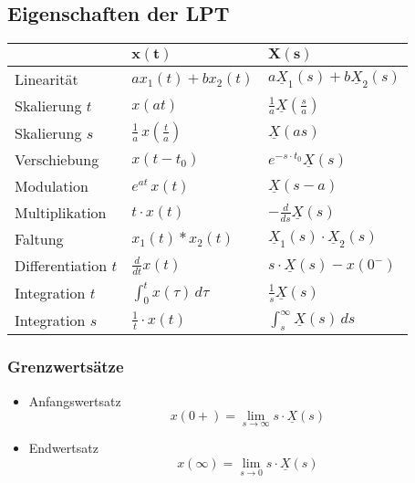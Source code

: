 \subsection{Eigenschaften der LPT}
\renewcommand{\arraystretch}{1.7}
\begin{tabularx}{\columnwidth}{|X|X|X|}
	\hline
	& $\mathbf{x(t)}$ & \underline{$\mathbf{X}$}$\mathbf{(s)}$\\
	\hline Linearität & $a x_{1}(t)+b x_{2}(t)$ & $a \underline{X}_{1}(s)+b\underline{X}_{2}(s)$ \\
	\hline Skalierung $t$ & $x(at)$ & $\frac{1}{a} \underline{X}(\frac{s}{a})$ \\
	\hline Skalierung $s$ & $\frac{1}{a} \, x(\frac{t}{a})$ & $\underline{X}(as)$ \\
	\hline Verschiebung	& $x(t-t_0)$ & $e^{-s \cdot t_0} \underline{X}(s)$ \\
	\hline Modulation & $e^{at} \, x(t)$ & $\underline{X} (s-a)$ \\
	\hline Multiplikation & $t \cdot x(t) $ & $-\frac{d}{d s} \underline{X}(s)$ \\
	\hline Faltung & $x_{1}(t) * x_{2}(t) $ & $ \underline{X}_{1}(s) \cdot \underline{X}_{2}(s)$ \\
	\hline Differentiation $t$ & $ \frac{d}{dt} x(t) $ & $ s\cdot \underline{X}(s)-x(0^-)$ \\
	\hline Integration $t$ & $\int_{0}^{t} x(\tau) \, d\tau $ & $ \frac{1}{s} \underline{X}(s)$ \\
	\hline Integration $s$ & $\frac{1}{t} \cdot x(t) $ & $ \int_{s}^{\infty} \underline{X}(s) \, ds$ \\
	\hline
\end{tabularx}

\subsubsection{Grenzwertsätze}
\begin{itemize}
	\item Anfangswertsatz 
	$$x(0+) = \lim_{s\to\infty} s\cdot \underline{X}(s)$$
	\item Endwertsatz 
	$$x(\infty) = \lim_{s\to 0} s\cdot \underline{X}(s)$$
\end{itemize}

